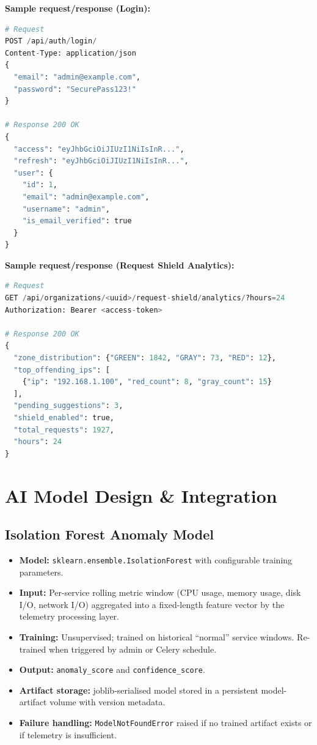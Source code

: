 \textbf{Sample request/response (Login):}
\begin{lstlisting}[language=Python,caption={Login API request and response},label={lst:api_login}]
# Request
POST /api/auth/login/
Content-Type: application/json
{
  "email": "admin@example.com",
  "password": "SecurePass123!"
}

# Response 200 OK
{
  "access": "eyJhbGciOiJIUzI1NiIsInR...",
  "refresh": "eyJhbGciOiJIUzI1NiIsInR...",
  "user": {
    "id": 1,
    "email": "admin@example.com",
    "username": "admin",
    "is_email_verified": true
  }
}
\end{lstlisting}

\textbf{Sample request/response (Request Shield Analytics):}
\begin{lstlisting}[language=Python,caption={Request Shield analytics response},label={lst:api_shield}]
# Request
GET /api/organizations/<uuid>/request-shield/analytics/?hours=24
Authorization: Bearer <access-token>

# Response 200 OK
{
  "zone_distribution": {"GREEN": 1842, "GRAY": 73, "RED": 12},
  "top_offending_ips": [
    {"ip": "192.168.1.100", "red_count": 8, "gray_count": 15}
  ],
  "pending_suggestions": 3,
  "shield_enabled": true,
  "total_requests": 1927,
  "hours": 24
}
\end{lstlisting}

\section{AI Model Design \& Integration}

\subsection{Isolation Forest Anomaly Model}

\begin{itemize}
  \item \textbf{Model:} \texttt{sklearn.ensemble.IsolationForest} with
        configurable training parameters.
  \item \textbf{Input:} Per-service rolling metric window (CPU usage, memory
        usage, disk I/O, network I/O) aggregated into a fixed-length feature
        vector by the telemetry processing layer.
  \item \textbf{Training:} Unsupervised; trained on historical ``normal''
        service windows.  Re-trained when triggered by admin or Celery schedule.
  \item \textbf{Output:}   \texttt{anomaly\_score} and \texttt{confidence\_score}.
  \item \textbf{Artifact storage:} joblib-serialised model stored in
        a persistent model-artifact volume with version metadata.
  \item \textbf{Failure handling:} \texttt{ModelNotFoundError} raised if no
        trained artifact exists or if telemetry is insufficient.
\end{itemize}

